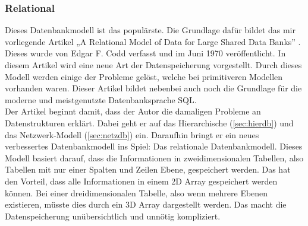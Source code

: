 \documentclass[a4paper, 12pt]{article}
\theoremstyle{plain}
\theoremstyle{definition}
\begin{document}
	\subsubsection{Relational}
	\label{sec:reldb}
	Dieses Datenbankmodell ist das populärste. Die Grundlage dafür bildet das mir vorliegende Artikel „A Relational Model of Data for Large Shared Data Banks” \cite{Codd1970}. Dieses wurde von Edgar F. Codd verfasst und im Juni 1970 veröffentlicht. In diesem Artikel wird eine neue Art der Datenspeicherung vorgestellt. Durch dieses Modell werden einige der Probleme gelöst, welche bei primitiveren Modellen vorhanden waren. Dieser Artikel bildet nebenbei auch noch die Grundlage für die moderne und meistgenutzte Datenbanksprache SQL. \\
Der Artikel beginnt damit, dass der Autor die damaligen Probleme an Datenstrukturen erklärt. Dabei geht er auf das Hierarchische (\ref{sec:hierdb}) und das Netzwerk-Modell (\ref{sec:netzdb}) ein. Daraufhin bringt er ein neues verbessertes Datenbankmodell ins Spiel: Das relationale Datenbankmodell. Dieses Modell basiert darauf, dass die Informationen in zweidimensionalen Tabellen, also Tabellen mit nur einer Spalten und Zeilen Ebene, gespeichert werden. Das hat den Vorteil, dass alle Informationen in einem 2D Array gespeichert werden können. Bei einer dreidimensionalen Tabelle, also wenn mehrere Ebenen existieren, müsste dies durch ein 3D Array dargestellt werden. Das macht die Datenspeicherung unübersichtlich und unnötig kompliziert.\\
\end{document}
